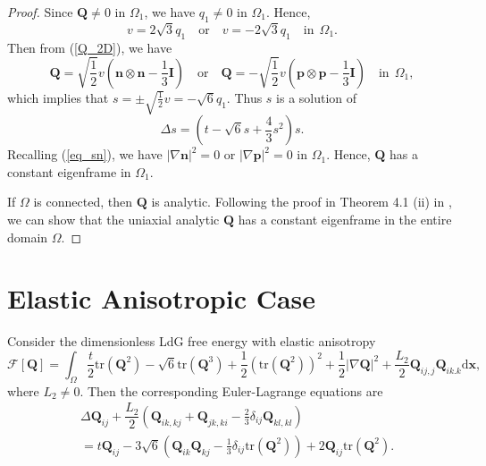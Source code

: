 \documentclass[10pt, a4paper]{article}
\newcommand\dd{\mathrm{d}}
\newcommand\n{\mathbf{n}}
\newcommand\p{\mathbf{p}}
\newcommand\Qvec{\mathbf{Q}}
\newcommand\tr{\mathrm{tr}}
\begin{document}
\begin{proof}
Since $\Qvec \neq 0$ in $\Omega_1$, we have $q_1 \neq 0$ in $\Omega_1$. Hence,
\begin{equation}
v = 2 \sqrt{3} q_1 \quad \text{or} \quad v = -2 \sqrt{3} q_1 \quad  \text{in} ~~ \Omega_1.
\end{equation}
Then from (\ref{Q_2D}), we have
\begin{equation}
\Qvec = \sqrt{\frac{1}{2}}v (\n \otimes \n - \frac{1}{3} \mathbf{I}) \quad \text{or} \quad \Qvec = - \sqrt{\frac{1}{2}}v (\p \otimes \p - \frac{1}{3} \mathbf{I}) \quad \text{in} ~~ \Omega_1,
\end{equation}
which implies that $s = \pm \sqrt{\frac{1}{2}}v = - \sqrt{6} q_1$. Thus $s$ is a solution of 
\begin{equation}
\Delta s = (t - \sqrt{6} s + \frac{4}{3} s^2) s.
\end{equation}
Recalling (\ref{eq_sn}), we have $|\nabla \n|^2 = 0$ or $|\nabla \p|^2 = 0$ in $\Omega_1$. Hence, $\Qvec$ has a constant eigenframe in $\Omega_1$. 

If $\Omega$ is connected, then $\Qvec$ is analytic. Following the proof in Theorem 4.1 (ii) in \cite{lamy2015uniaxial}, we can show that the uniaxial analytic $\Qvec$ has a constant eigenframe in the entire domain $\Omega$.





\end{proof}


\section{Elastic Anisotropic Case}
\label{sec:anisotropic}

Consider the dimensionless LdG free energy with elastic anisotropy
\begin{equation}\label{eq_dimless_AE}
\mathcal{F}[\Qvec] = \int_{\Omega} \frac{t}{2} \tr(\Qvec^2) - \sqrt{6} \tr(\Qvec^3) + \frac{1}{2} (\tr(\Qvec^2))^2
+ \frac{1}{2} |\nabla \Qvec|^2  + \frac{L_2}{2} \Qvec_{ij,j}\Qvec_{ik.k}  \dd \mathbf{x},
\end{equation}
where $L_2 \neq 0$. Then the corresponding Euler-Lagrange equations are
\begin{equation}\label{AE-E-L}
  \begin{aligned}
    &  \Delta \Qvec_{ij} + \dfrac{L_2}{2} \left( \Qvec_{ik,kj} + \Qvec_{jk,ki} - \frac{2}{3} \delta_{ij} \Qvec_{kl, kl} \right) \\
    &    = t \Qvec_{ij} - 3 \sqrt{6} \left( \Qvec_{ik}\Qvec_{kj} - \frac{1}{3} \delta_{ij} \tr(\Qvec^2) \right) + 2 \Qvec_{ij} \tr(\Qvec^2).
  \end{aligned}
\end{equation}
\end{document}
